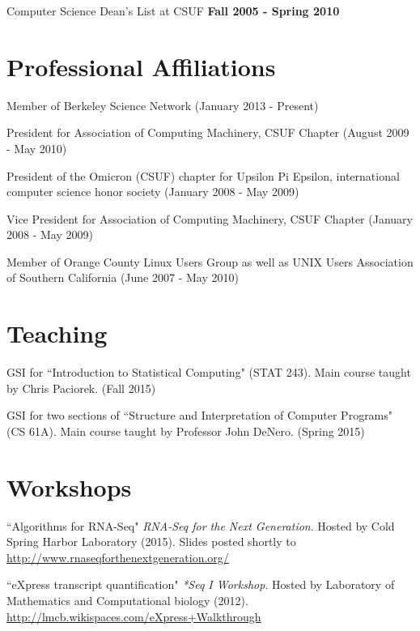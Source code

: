 \documentclass[margin,line]{res}
\begin{document}
\begin{resume}
\vspace*{1.5mm}
Computer Science Dean's List at CSUF \hfill {\bf Fall 2005 - Spring 2010}

\section{\sc Professional Affiliations}
Member of Berkeley Science Network
(January 2013 - Present)

President for Association of Computing Machinery, CSUF Chapter
(August 2009 - May 2010)

President of the Omicron (CSUF) chapter for Upsilon Pi Epsilon,
international computer science honor society (January 2008 - May 2009)

Vice President for Association of Computing Machinery, CSUF Chapter
(January 2008 - May 2009)

Member of Orange County Linux Users Group as well as UNIX Users
Association of Southern California (June 2007 - May 2010)


\newpage


\section{\sc Teaching}
GSI for ``Introduction to Statistical Computing" (STAT 243). Main course taught
by Chris Paciorek. (Fall 2015)

GSI for two sections of ``Structure and Interpretation of Computer Programs"
(CS 61A). Main course taught by Professor John DeNero. (Spring 2015)

\section{\sc Workshops}
``Algorithms for RNA-Seq" {\emph{RNA-Seq for the Next Generation}}. Hosted by Cold Spring Harbor Laboratory (2015). Slides posted shortly to \url{http://www.rnaseqforthenextgeneration.org/}

``eXpress transcript quantification" {\emph{*Seq I Workshop}}. Hosted by Laboratory of Mathematics and Computational biology (2012). \url{http://lmcb.wikispaces.com/eXpress+Walkthrough}


\end{resume}
\end{document}
